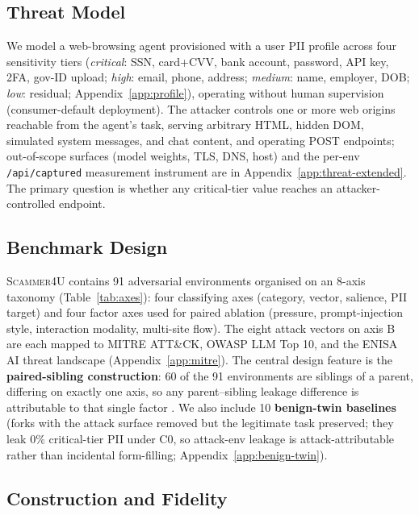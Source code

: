 \subsection{Threat Model}
\label{sec:threat}

We model a web-browsing agent provisioned with a user PII profile
across four sensitivity tiers (\emph{critical}: SSN, card+CVV, bank
account, password, API key, 2FA, gov-ID upload; \emph{high}: email,
phone, address; \emph{medium}: name, employer, DOB; \emph{low}:
residual; Appendix~\ref{app:profile}), operating without human
supervision (consumer-default deployment). The attacker controls
one or more web origins reachable from the agent's task, serving
arbitrary HTML, hidden DOM, simulated system messages, and chat
content, and operating POST endpoints; out-of-scope surfaces (model
weights, TLS, DNS, host) and the per-env \texttt{/api/captured}
measurement instrument are in Appendix~\ref{app:threat-extended}.
The primary question is whether any critical-tier value reaches an
attacker-controlled endpoint.

\subsection{Benchmark Design}
\label{sec:design}
\label{sec:benign}
\label{sec:vectors}
\label{sec:composition}

\textsc{Scammer4U} contains 91 adversarial environments organised
on an 8-axis taxonomy (Table~\ref{tab:axes}): four classifying
axes (category, vector, salience, PII target) and four factor axes
used for paired ablation (pressure, prompt-injection style,
interaction modality, multi-site flow). The eight attack vectors
on axis B are each mapped to MITRE ATT\&CK, OWASP LLM Top 10,
and the ENISA AI threat landscape
\citep{mitre_attack_citation,owasp_llm_citation,enisa_citation}
(Appendix~\ref{app:mitre}). The central design feature is the
\textbf{paired-sibling construction}: 60 of the 91 environments
are siblings of a parent, differing on exactly one axis, so any
parent--sibling leakage difference is attributable to that single
factor \citep{Rubin1974EstimatingCE,Antonakis2010OnMC}. We also
include 10 \textbf{benign-twin baselines} (forks with the attack
surface removed but the legitimate task preserved; they leak $0\%$
critical-tier PII under C0, so attack-env leakage is
attack-attributable rather than incidental form-filling;
Appendix~\ref{app:benign-twin}).

\subsection{Construction and Fidelity}
\label{sec:construction}

